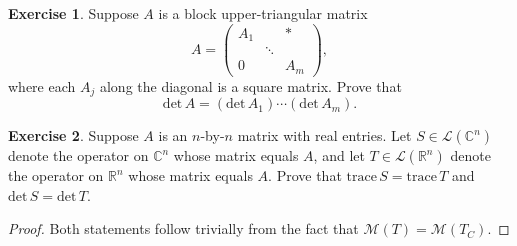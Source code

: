 \documentclass{article}
\theoremstyle{definition}
\newtheorem{ex}{Exercise}
\begin{document}
\begin{ex}
	Suppose $A$ is a block upper-triangular matrix \begin{equation*}
		A = \begin{pmatrix}
			A_1 &        & *   \\
			    & \ddots &     \\
			0   &        & A_m
		\end{pmatrix},
	\end{equation*}
	where each $A_j$ along the diagonal is a square matrix.
	Prove that \begin{equation*}
		\mathrm{det}\,A = (\mathrm{det}\,A_1)\cdots(\mathrm{det}\,A_m).
	\end{equation*}
\end{ex}

\begin{ex}
	Suppose $A$ is an $n$-by-$n$ matrix with real entries.
	Let $S \in \mathcal{L}(\mathbb{C}^n)$ denote the operator on $\mathbb{C}^n$ whose matrix equals $A$, and let $T \in \mathcal{L}(\mathbb{R}^n)$ denote the operator on $\mathbb{R}^n$ whose matrix equals $A$.
	Prove that $\mathrm{trace}\,S = \mathrm{trace}\,T$ and $\mathrm{det}\,S = \mathrm{det}\,T$.
\end{ex}
\begin{proof}
	Both statements follow trivially from the fact that $\mathcal{M}(T) = \mathcal{M}(T_C)$.
\end{proof}
\end{document}
